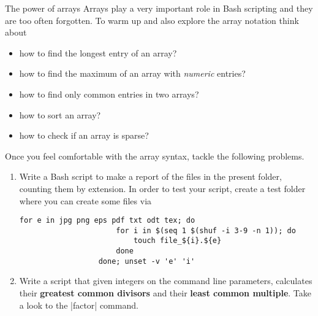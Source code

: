 
\begin{exercise}[DodgerBlue]{The power of arrays}
    Arrays play a very important role in Bash scripting and they are too often forgotten.
    To warm up and also explore the array notation think about
    \begin{itemize}
        \item how to find the longest entry of an array?
        \item how to find the maximum of an array with \emph{numeric} entries?
        \item how to find only common entries in two arrays?
        \item how to sort an array?
        \item how to check if an array is sparse?
    \end{itemize}
    Once you feel comfortable with the array syntax, tackle the following problems.
    \begin{enumerate}[after=\vspace{-\baselineskip}]
        \item Write a Bash script to make a report of the files in the present folder, counting them by extension.
              In order to test your script, create a test folder where you can create some files via
              \begin{lstlisting}[style=MyBash]
                  for e in jpg png eps pdf txt odt tex; do
                      for i in $(seq 1 $(shuf -i 3-9 -n 1)); do
                          touch file_${i}.${e}
                      done
                  done; unset -v 'e' 'i'
              \end{lstlisting}
        \item Write a script that given integers on the command line parameters, calculates their \textbf{greatest common divisors} and their \textbf{least common multiple}.
              Take a look to the \bash|factor| command.
    \end{enumerate}
\end{exercise}

